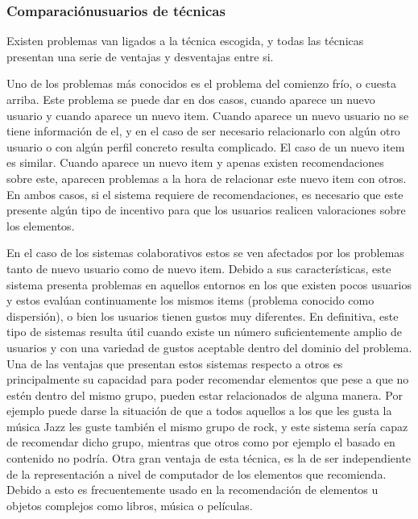 \subsubsection{Comparaciónusuarios de técnicas}
Existen problemas van ligados a la técnica escogida, y todas las técnicas presentan una serie de ventajas y desventajas entre si.

Uno de los problemas más conocidos es el problema del comienzo frío, o cuesta arriba. %
Este problema se puede dar en dos casos, cuando aparece un nuevo usuario y cuando aparece un nuevo item. Cuando aparece un nuevo usuario no se tiene información de el, y en el caso de ser necesario relacionarlo con algún otro usuario o con algún perfil concreto resulta complicado. El caso de un nuevo item es similar. Cuando aparece un nuevo item y apenas existen recomendaciones sobre este, aparecen problemas a la hora de relacionar este nuevo item con otros. En ambos casos, si el sistema requiere de recomendaciones, es necesario que este presente algún tipo de incentivo para que los usuarios realicen valoraciones sobre los elementos.

En el caso de los sistemas colaborativos estos se ven afectados por los problemas tanto de nuevo usuario como de nuevo item. Debido a sus características, este sistema presenta problemas en aquellos entornos en los que existen pocos usuarios y estos evalúan continuamente los mismos items (problema conocido como dispersión), o bien los usuarios tienen gustos muy diferentes. En definitiva, este tipo de sistemas resulta útil cuando existe un número suficientemente amplio de usuarios y con una variedad de gustos aceptable dentro del dominio del problema. Una de las ventajas que presentan estos sistemas respecto a otros es principalmente su capacidad para poder recomendar elementos que pese a que no estén dentro del mismo grupo, pueden estar relacionados de alguna manera. Por ejemplo puede darse la situación de que a todos aquellos a los que les gusta la música Jazz les guste también el mismo grupo de rock, y este sistema sería capaz de recomendar dicho grupo, mientras que otros como por ejemplo el basado en contenido no podría. Otra gran ventaja de esta técnica, es la de ser independiente de la representación a nivel de computador de los elementos que recomienda. Debido a esto es frecuentemente usado en la recomendación de elementos u objetos complejos como libros, música o películas.

